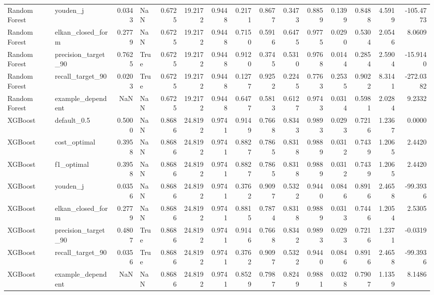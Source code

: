 \begin{table}
\begin{tabular}{llrlrrrrrrrrrrr}
Random Forest & youden\_j & 0.0343 & NaN & 0.6725 & 19.2172 & 0.9448 & 0.2171 & 0.8677 & 0.3473 & 0.8859 & 0.1399 & 0.8488 & 4.5919 & -105.4773 \\
Random Forest & elkan\_closed\_form & 0.2779 & NaN & 0.6725 & 19.2172 & 0.9448 & 0.7150 & 0.5916 & 0.6475 & 0.9775 & 0.0290 & 0.5304 & 2.0546 & 8.0609 \\
Random Forest & precision\_target\_90 & 0.7625 & True & 0.6725 & 19.2172 & 0.9448 & 0.9120 & 0.3745 & 0.5310 & 0.9768 & 0.0144 & 0.2854 & 2.5904 & -15.9140 \\
Random Forest & recall\_target\_90 & 0.0203 & True & 0.6725 & 19.2172 & 0.9448 & 0.1277 & 0.9252 & 0.2245 & 0.7763 & 0.2535 & 0.9022 & 8.3141 & -272.0382 \\
Random Forest & example\_dependent & NaN & NaN & 0.6725 & 19.2172 & 0.9448 & 0.6477 & 0.5813 & 0.6127 & 0.9743 & 0.0314 & 0.5981 & 2.0284 & 9.2332 \\
XGBoost & default\_0.5 & 0.5000 & NaN & 0.8686 & 24.8192 & 0.9741 & 0.9149 & 0.7668 & 0.8343 & 0.9893 & 0.0293 & 0.7216 & 1.2367 & 0.0000 \\
XGBoost & cost\_optimal & 0.3958 & NaN & 0.8686 & 24.8192 & 0.9741 & 0.8827 & 0.7865 & 0.8318 & 0.9889 & 0.0312 & 0.7439 & 1.2065 & 2.4420 \\
XGBoost & f1\_optimal & 0.3958 & NaN & 0.8686 & 24.8192 & 0.9741 & 0.8827 & 0.7865 & 0.8318 & 0.9889 & 0.0312 & 0.7439 & 1.2065 & 2.4420 \\
XGBoost & youden\_j & 0.0356 & NaN & 0.8686 & 24.8192 & 0.9741 & 0.3762 & 0.9097 & 0.5322 & 0.9440 & 0.0846 & 0.8916 & 2.4658 & -99.3936 \\
XGBoost & elkan\_closed\_form & 0.2779 & NaN & 0.8686 & 24.8192 & 0.9741 & 0.8815 & 0.7874 & 0.8318 & 0.9889 & 0.0313 & 0.7446 & 1.2054 & 2.5305 \\
XGBoost & precision\_target\_90 & 0.4807 & True & 0.8686 & 24.8192 & 0.9741 & 0.9146 & 0.7668 & 0.8342 & 0.9893 & 0.0293 & 0.7216 & 1.2371 & -0.0319 \\
XGBoost & recall\_target\_90 & 0.0356 & True & 0.8686 & 24.8192 & 0.9741 & 0.3762 & 0.9097 & 0.5322 & 0.9440 & 0.0846 & 0.8916 & 2.4658 & -99.3936 \\
XGBoost & example\_dependent & NaN & NaN & 0.8686 & 24.8192 & 0.9741 & 0.8529 & 0.7987 & 0.8249 & 0.9881 & 0.0328 & 0.7907 & 1.1359 & 8.1486 \\
\bottomrule
\end{tabular}
\end{table}
